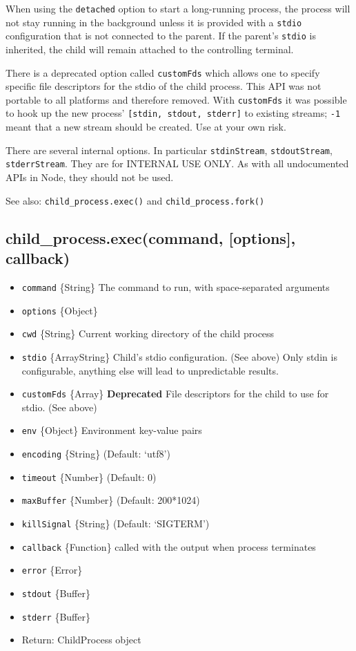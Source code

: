 When using the \texttt{detached} option to start a long-running process,
the process will not stay running in the background unless it is
provided with a \texttt{stdio} configuration that is not connected to
the parent. If the parent's \texttt{stdio} is inherited, the child will
remain attached to the controlling terminal.

There is a deprecated option called \texttt{customFds} which allows one
to specify specific file descriptors for the stdio of the child process.
This API was not portable to all platforms and therefore removed. With
\texttt{customFds} it was possible to hook up the new process'
\texttt{{[}stdin, stdout, stderr{]}} to existing streams; \texttt{-1}
meant that a new stream should be created. Use at your own risk.

There are several internal options. In particular \texttt{stdinStream},
\texttt{stdoutStream}, \texttt{stderrStream}. They are for INTERNAL USE
ONLY. As with all undocumented APIs in Node, they should not be used.

See also: \texttt{child\_process.exec()} and
\texttt{child\_process.fork()}

\subsection{child\_process.exec(command, {[}options{]}, callback)}

\begin{itemize}
\item
  \texttt{command} \{String\} The command to run, with space-separated
  arguments
\item
  \texttt{options} \{Object\}
\item
  \texttt{cwd} \{String\} Current working directory of the child process
\item
  \texttt{stdio} \{Array\textbar{}String\} Child's stdio configuration.
  (See above) Only stdin is configurable, anything else will lead to
  unpredictable results.
\item
  \texttt{customFds} \{Array\} \textbf{Deprecated} File descriptors for
  the child to use for stdio. (See above)
\item
  \texttt{env} \{Object\} Environment key-value pairs
\item
  \texttt{encoding} \{String\} (Default: `utf8')
\item
  \texttt{timeout} \{Number\} (Default: 0)
\item
  \texttt{maxBuffer} \{Number\} (Default: 200*1024)
\item
  \texttt{killSignal} \{String\} (Default: `SIGTERM')
\item
  \texttt{callback} \{Function\} called with the output when process
  terminates
\item
  \texttt{error} \{Error\}
\item
  \texttt{stdout} \{Buffer\}
\item
  \texttt{stderr} \{Buffer\}
\item
  Return: ChildProcess object
\end{itemize}

